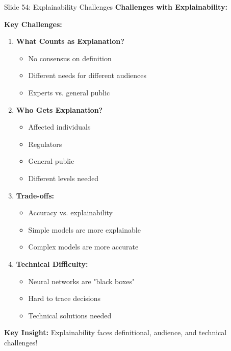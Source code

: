 \documentclass[8pt]{beamer}
\begin{document}
	\begin{frame}{Slide 54: Explainability Challenges}
		\fontsize{6.5}{7.5}\selectfont
		\textbf{Challenges with Explainability:}
		
		\vspace{0.1cm}
		\textbf{Key Challenges:}
		\begin{enumerate}
			\item \textbf{What Counts as Explanation?}
			\begin{itemize}
				\item No consensus on definition
				\item Different needs for different audiences
				\item Experts vs. general public
			\end{itemize}
			\item \textbf{Who Gets Explanation?}
			\begin{itemize}
				\item Affected individuals
				\item Regulators
				\item General public
				\item Different levels needed
			\end{itemize}
			\item \textbf{Trade-offs:}
			\begin{itemize}
				\item Accuracy vs. explainability
				\item Simple models are more explainable
				\item Complex models are more accurate
			\end{itemize}
			\item \textbf{Technical Difficulty:}
			\begin{itemize}
				\item Neural networks are "black boxes"
				\item Hard to trace decisions
				\item Technical solutions needed
			\end{itemize}
		\end{enumerate}
		
		\textcolor{myblue}{\textbf{Key Insight:}} Explainability faces \textcolor{myblue}{definitional, audience, and technical challenges}!
	\end{frame}
	
\end{document}
